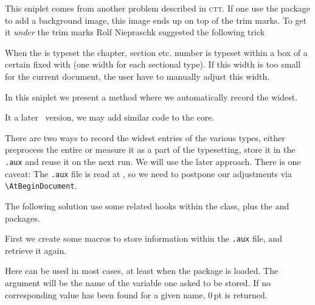 \begin{sniplet}
This sniplet comes from another problem described in \textsc{ctt}. If
one use the  package to add a background image, this
image ends up on top of the trim marks. To get it \emph{under} the
trim marks Rolf Niepraschk suggested the following trick
  
\end{sniplet}


\begin{sniplet}
  \label{snip:autotoc}

  When the \toc{} is typeset the chapter, section etc. number is
  typeset within a box of a certain fixed with (one width for each
  sectional type).  If this width is too small for the current
  document, the user have to manually adjust this width.

  In this sniplet we present a method where we automatically record
  the widest.

  It a later \theclass\ version, we may add similar code to the core.

  There are two ways to record the widest entries of the various
  types, either preprocess the entire \toc{} or measure it as a part
  of the \toc{} typesetting, store it in the \texttt{.aux} and reuse
  it on the next run. We will use the later approach. There is one
  caveat: The \texttt{.aux} file is read at \verb||,
    so we need to postpone our adjustments via \verb|\AtBeginDocument|.

  The following solution use some \toc{} related hooks within the
  class, plus the  and  packages.

  First we create some macros to store information within the
  \texttt{.aux} file, and retrieve it again.

  \begin{lcode}
    \makeatletter
    \newcommand\mem@auxrestore[2]{\csgdef{stored@value@#1}{#2}}
    \newcommand\memstorevalue[2]{%
      \@bsphack%
      \immediate\write\@mainaux{\string\mem@auxrestore{#1}{#2}}%
      \@esphack}
    \newcommand\RetrieveStoredLength[1]{%
      \ifcsdef{stored@value@#1}{\csuse{stored@value@#1}}{0pt}}%
    \makeatletter
  \end{lcode}
  Here  can be used in most \cmd{\setlength}
  cases, at least when the  package is loaded. The
  argument will be the name of the variable one asked to be stored. If
  no corresponding value has been found for a given name, 0\,pt is returned.


\end{sniplet}
